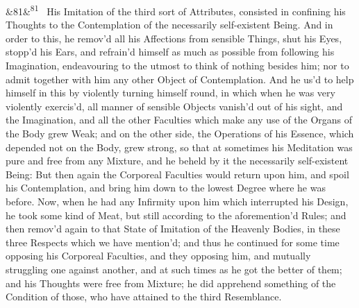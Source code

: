 \documentclass[12pt]{article}
\newcommand{\para}[1][]{\par\noindent\ifx&#1&\else\textsuperscript{\footnotesize #1}~\fi}
\begin{document}
\para[81] His Imitation of the third sort of Attributes, consisted in confining his Thoughts to the Contemplation of the necessarily self-existent Being. And in order to this, he remov'd all his Affections from sensible Things, shut his Eyes, stopp'd his Ears, and refrain'd himself as much as possible from following his Imagination, endeavouring to the utmost to think of nothing besides him; nor to admit together with him any other Object of Contemplation. And he us'd to help himself in this by violently turning himself round, in which when he was very violently exercis'd, all manner of sensible Objects vanish'd out of his sight, and the Imagination, and all the other Faculties which make any use of the Organs of the Body grew Weak; and on the other side, the Operations of his Essence, which depended not on the Body, grew strong, so that at sometimes his Meditation was pure and free from any Mixture, and he beheld by it the necessarily self-existent Being: But then again the Corporeal Faculties would return upon him, and spoil his Contemplation, and bring him down to the lowest Degree where he was before. Now, when he had any Infirmity upon him which interrupted his Design, he took some kind of Meat, but still according to the aforemention'd Rules; and then remov'd again to that State of Imitation of the Heavenly Bodies, in these three Respects which we have mention'd; and thus he continued for some time opposing his Corporeal Faculties, and they opposing him, and mutually struggling one against another, and at such times as he got the better of them; and his Thoughts were free from Mixture; he did apprehend something of the Condition of those, who have attained to the third Resemblance.
\end{document}
